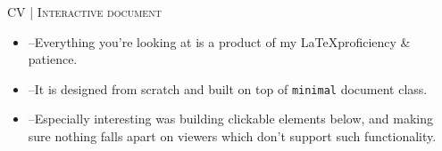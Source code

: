 \begin{minipage}[t]{\linewidth}\vspace{\subsectionSpace}
{\subtitleFont\bold CV \extraLight\scshape| Interactive document \href{https://github.com/luka-j/CV/tree/latex-v3}{\faGithub}}\newline

\vspace{\ribbonTopMargin}
\ribbonLatex \ribbonFontAwesome \newline
\vspace{\ribbonBottomMargin}

{\contentFont\begin{itemize}
    \item --Everything you're looking at is a product of my \LaTeX proficiency \& patience.
    \item --It is designed from scratch and built on top of \texttt{minimal} document class.
    \item --Especially interesting was building clickable elements below, and making sure nothing falls apart on viewers which don't support such functionality.
\end{itemize}}
\end{minipage}\newline